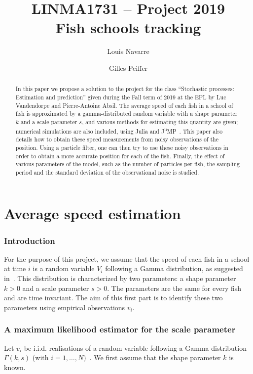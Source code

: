 \documentclass[final]{aomart}
\title[Fish schools tracking]{LINMA1731 -- Project 2019\\
Fish schools tracking}
\author{Louis Navarre}
\author{Gilles Peiffer}
\newtheorem[{}\it]{thm}{Theorem}[section]
\theoremstyle{definition}
\newtheorem*[{}\it]{notation}{Notation}
\numberwithin{equation}{section}
\begin{document}
\begin{abstract}
	In this paper we propose a solution to the project for the class ``Stochastic processes: Estimation and prediction'' given during the Fall term of 2019 at the EPL by Luc Vandendorpe and Pierre-Antoine Absil.
	The average speed of each fish in a school of fish is approximated by a gamma-distributed random variable with a shape parameter \(k\) and a scale parameter \(s\), and various methods for estimating this quantity are given; numerical simulations are also included, using Julia and J\textsuperscript{u}MP~\cite{DunningHuchetteLubin2017}.
	This paper also details how to obtain these speed measurements from noisy observations of the position.
	Using a particle filter, one can then try to use these noisy observations in order to obtain a more accurate position for each of the fish.
	Finally, the effect of various parameters of the model, such as the number of particles per fish, the sampling period and the standard deviation of the observational noise is studied.
\end{abstract}

\maketitle
\tableofcontents
\newpage

\part{Average speed estimation}
\section{Introduction}
For the purpose of this project, we assume that the speed of each fish in a school
at time \(i\) is a random variable \(V_i\) following a Gamma distribution, as suggested in~\cite{huth:sim}.
This distribution is characterized by two parameters:
a shape parameter \(k > 0\) and a scale parameter \(s > 0\).
The parameters are the same for every fish and are time invariant.
The aim of this first part is to identify these two parameters using empirical observations \(v_i\).

\section{A maximum likelihood estimator for the scale parameter}
\label{sec:s_est}
Let \(v_i\) be i.i.d. realisations of a random variable following a Gamma distribution \(\Gamma(k, s)\) (with \(i = 1,\ldots, N)\)~\cite{wiki:gamma}.
We first assume that the shape parameter \(k\) is known.
\end{document}
